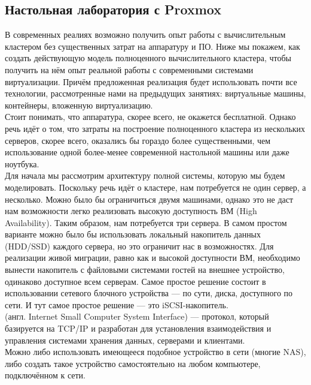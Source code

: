\documentclass[14pt, a4paper]{article}
\begin{document}
\subsection*{Настольная лаборатория с Proxmox} 

В современных реалиях возможно получить опыт работы с вычислительным кластером без
существенных затрат на аппаратуру и ПО. Ниже мы покажем, как создать действующую модель
полноценного вычислительного кластера, чтобы получить на нём опыт реальной работы с
современными системами виртуализации. Причём предложенная реализация будет использовать
почти все технологии, рассмотренные нами на предыдущих занятиях: виртуальные машины,
контейнеры, вложенную виртуализацию.\\

Стоит понимать, что аппаратура, скорее всего, не окажется бесплатной. Однако речь идёт о том, что
затраты на построение полноценного кластера из нескольких серверов, скорее всего, оказались бы
гораздо более существенными, чем использование одной более-менее современной настольной
машины или даже ноутбука.\\

Для начала мы рассмотрим архитектуру полной системы, которую мы будем моделировать. Поскольку
речь идёт о кластере, нам потребуется не один сервер, а несколько. Можно было бы ограничиться
двумя машинами, однако это не даст нам возможности легко реализовать высокую доступность ВМ
(High Availability). Таким образом, нам потребуется три сервера. В самом простом варианте можно
было бы использовать локальный накопитель данных (HDD/SSD) каждого сервера, но это ограничит
нас в возможностях. Для реализации живой миграции, равно как и высокой доступности ВМ,
необходимо вынести накопитель с файловыми системами гостей на внешнее устройство, одинаково
доступное всем серверам. Самое простое решение состоит в использовании сетевого блочного
устройства — по сути, диска, доступного по сети. И тут самое простое решение — это
iSCSI-накопитель.\\

\href{https://ru.wikipedia.org/wiki/ISCSI}{} (англ. Internet Small Computer System Interface) — протокол, который базируется на TCP/IP и
разработан для установления взаимодействия и управления системами хранения данных, серверами
и клиентами.\\

Можно либо использовать имеющееся подобное устройство в сети (многие NAS), либо создать такое
устройство самостоятельно на любом компьютере, подключённом к сети.\\
\end{document}
